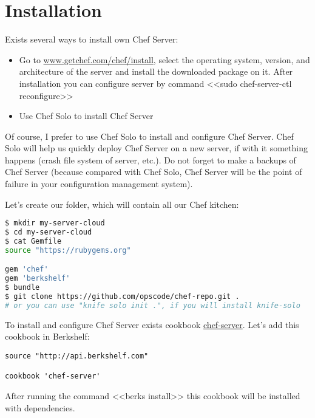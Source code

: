 \section{Installation}
\label{sec:server-installation}

Exists several ways to install own Chef Server:

\begin{itemize}
  \item Go to \href{http://www.getchef.com/chef/install/}{www.getchef.com/chef/install}, select the operating system, version, and architecture of the server and install the downloaded package on it. After installation you can configure server by command <<sudo chef-server-ctl reconfigure>>
  \item Use Chef Solo to install Chef Server
\end{itemize}

Of course, I prefer to use Chef Solo to install and configure Chef Server. Chef Solo will help us quickly deploy Chef Server on a new server, if with it something happens (crash file system of server, etc.). Do not forget to make a backups of Chef Server (because compared with Chef Solo, Chef Server will be the point of failure in your configuration management system).

Let's create our folder, which will contain all our Chef kitchen:

\begin{lstlisting}[language=Bash,label=lst:my-server-cloud-installation1]
$ mkdir my-server-cloud
$ cd my-server-cloud
$ cat Gemfile
source "https://rubygems.org"

gem 'chef'
gem 'berkshelf'
$ bundle
$ git clone https://github.com/opscode/chef-repo.git .
# or you can use "knife solo init .", if you will install knife-solo
\end{lstlisting}

To install and configure Chef Server exists cookbook \href{http://community.opscode.com/cookbooks/chef-server}{chef-server}. Let's add this cookbook in Berkshelf:

\begin{lstlisting}[label=lst:my-server-cloud-installation2,title=my-server-cloud/Berkshelf]
source "http://api.berkshelf.com"

cookbook 'chef-server'
\end{lstlisting}

After running the command <<berks install>> this cookbook will be installed with dependencies.

